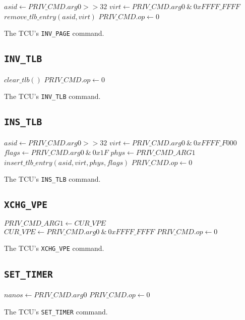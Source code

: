\begin{algorithm}[H]
    $asid \gets PRIV\_CMD.arg0 >> 32$\;
    $virt \gets PRIV\_CMD.arg0\ \&\ 0xFFFF\_FFFF$\;
    \BlankLine
    $remove\_tlb\_entry(asid, virt)$\;
    $PRIV\_CMD.op \gets 0$\;
    \caption{The TCU's \texttt{INV\_PAGE} command.}
\end{algorithm}

\subsection{\texttt{INV\_TLB}}

\begin{algorithm}[H]
    $clear\_tlb()$\;
    $PRIV\_CMD.op \gets 0$\;
    \caption{The TCU's \texttt{INV\_TLB} command.}
\end{algorithm}

\subsection{\texttt{INS\_TLB}}

\begin{algorithm}[H]
    $asid \gets PRIV\_CMD.arg0 >> 32$\;
    $virt \gets PRIV\_CMD.arg0\ \&\ 0xFFFF\_F000$\;
    $flags \gets PRIV\_CMD.arg0\ \&\ 0x1F$\;
    $phys \gets PRIV\_CMD\_ARG1$\;
    \BlankLine
    $insert\_tlb\_entry(asid, virt, phys, flags)$\;
    $PRIV\_CMD.op \gets 0$\;
    \caption{The TCU's \texttt{INS\_TLB} command.}
\end{algorithm}
\extend{}

\subsection{\texttt{XCHG\_VPE}}

\begin{algorithm}[H]
    $PRIV\_CMD\_ARG1 \gets CUR\_VPE$\;
    $CUR\_VPE \gets PRIV\_CMD.arg0\ \&\ 0xFFFF\_FFFF$\;
    \BlankLine
    $PRIV\_CMD.op \gets 0$\;
    \caption{The TCU's \texttt{XCHG\_VPE} command.}
\end{algorithm}

\subsection{\texttt{SET\_TIMER}}

\begin{algorithm}[H]
    $nanos \gets PRIV\_CMD.arg0$\;
    \BlankLine
    $PRIV\_CMD.op \gets 0$\;
    \caption{The TCU's \texttt{SET\_TIMER} command.}
\end{algorithm}

